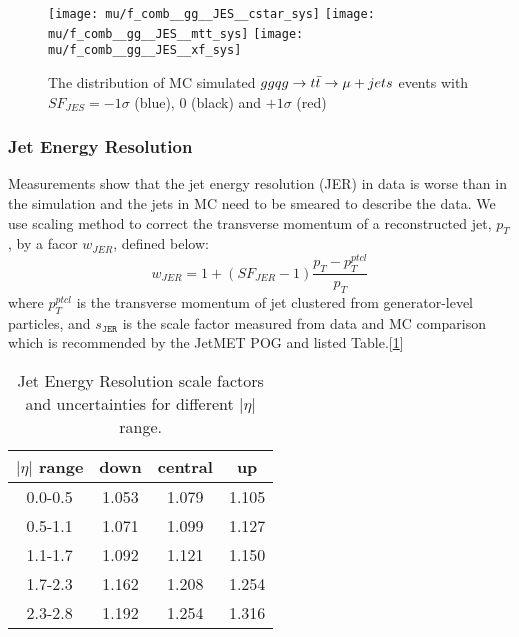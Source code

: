 \documentclass{cmspaperpdf}
\begin{document}
\begin{figure}[hbt]
  \begin{center}
    \texttt{[image: mu/f\_comb\_\_gg\_\_JES\_\_cstar\_sys]}
    \texttt{[image: mu/f\_comb\_\_gg\_\_JES\_\_mtt\_sys]}
    \texttt{[image: mu/f\_comb\_\_gg\_\_JES\_\_xf\_sys]}

  \caption{\small The distribution of MC simulated $gg\/qg\rightarrow t\bar{t}\rightarrow \mu+jets$ events with $SF_{JES} = -1\sigma$ (blue), 0 (black) and $+1\sigma$ (red)}
    \label{fig:gg_JES_templates}
  \end{center}
\end{figure}


\subsubsection{Jet Energy Resolution}
Measurements show that the jet energy resolution (JER) in data is worse than in the simulation and the jets in MC need to be smeared to describe the data. We use scaling method to correct the transverse momentum of a reconstructed jet, $p_T$, by a facor $w_{JER}$, defined below:
\begin{equation}
w_{JER}=1+(SF_{JER}-1)\frac{p_T-p_T ^{ptcl}}{p_T}
\end{equation}
where $p_T ^{ptcl}$ is the transverse momentum of jet clustered from generator-level particles, and $s_{\texttt{JER}}$ is the scale factor measured from data and MC comparison which is recommended by the JetMET POG\cite{JER_wiki} and listed Table.[\ref{tab:JER_SF}]

\begin{table}[htb]
\centering
\begin{tabular}{|cccc|}
\hline
$|\eta|$ range	 & down 		& central 	 &  up              \\ \hline
0.0-0.5     		 &  1.053       & 1.079   & 1.105             \\
0.5-1.1 	         &  1.071       & 1.099   & 1.127             \\ 
1.1-1.7          &  1.092       & 1.121   & 1.150              \\ 
1.7-2.3          &  1.162        & 1.208  & 1.254             \\
2.3-2.8          &  1.192       & 1.254   & 1.316              \\  \hline 
\end{tabular}
\caption{ Jet Energy Resolution scale factors and uncertainties for different $|\eta|$ range. }
\label{tab:JER_SF}
\end{table}
\end{document}
